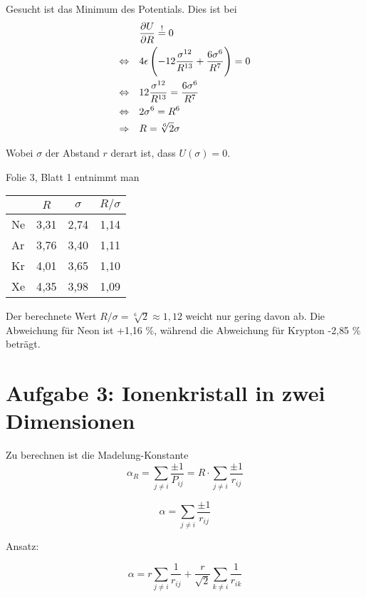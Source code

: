 \documentclass[a4paper,german,12pt,smallheadings]{scrartcl}
\begin{document}
\begin{enumerate}[a)]
    Gesucht ist das Minimum des Potentials. Dies ist bei
    \begin{align}
      &\frac{\partial U}{\partial R} \overset{!}{=} 0 \\
      \Leftrightarrow \quad &
      4 \epsilon \del{-12\frac{\sigma^{12}}{R^{13}} + \frac{6\sigma^6}{R^7}} = 0 \\
      \Leftrightarrow \quad &
      12\frac{\sigma^{12}}{R^{13}} = \frac{6\sigma^6}{R^7} \\
      \Leftrightarrow \quad &
      2 \sigma^6 = R^6 \\
      \Rightarrow \quad & R = \sqrt[6]{2} \sigma
    \end{align}

    Wobei $\sigma$ der Abstand $r$ derart ist, dass $U(\sigma) = 0$.

    Folie 3, Blatt 1 entnimmt man

    \begin{tabular}{l|c|c|c}
      & $R$ & $\sigma$ & $R/\sigma$ \\
      \hline
      Ne & 3{,}31 & 2{,}74 & 1{,}14 \\
      Ar & 3{,}76 & 3{,}40 & 1{,}11 \\
      Kr & 4{,}01 & 3{,}65 & 1{,}10 \\
      Xe & 4{,}35 & 3{,}98 & 1{,}09
    \end{tabular}

    Der berechnete Wert $R/\sigma = \sqrt[6]{2} \approx 1{,}12$ weicht
    nur gering davon ab. Die Abweichung für Neon ist +1{,}16 \%, während die
    Abweichung für Krypton -2{,}85 \% beträgt.
\end{enumerate}

\section*{Aufgabe 3: Ionenkristall in zwei Dimensionen}

Zu berechnen ist die Madelung-Konstante
\begin{equation}
  \alpha_R = \sum_{j \neq i} \frac{\pm 1}{P_{ij}} = R \cdot \sum_{j \neq i} \frac{\pm 1}{r_{ij}}
\end{equation}

\begin{equation}
  \alpha =  \sum_{j \neq i} \frac{\pm 1}{r_{ij}}
\end{equation}

Ansatz:

\begin{equation}
  \alpha = r  \sum_{j \neq i} \frac{1}{r_{ij}} + \frac{r}{\sqrt{2}} \sum_{k \neq i} \frac{1}{r_{ik}}
\end{equation}
\end{document}

